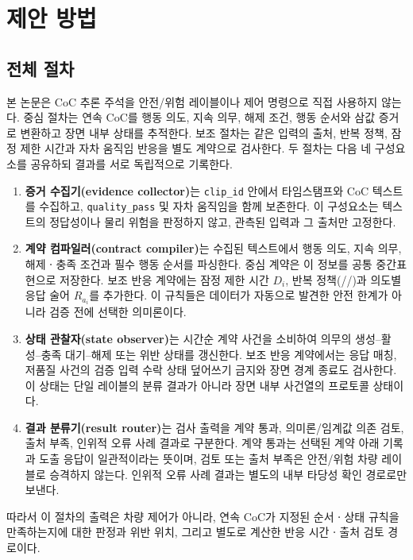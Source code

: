 \section{제안 방법}
\label{sec:method}

\subsection{전체 절차}
본 논문은 CoC 추론 주석을 안전/위험 레이블이나 제어 명령으로 직접 사용하지 않는다. 중심 절차는 연속 CoC를 행동 의도, 지속 의무, 해제 조건, 행동 순서와 삼값 증거로 변환하고 장면 내부 상태를 추적한다. 보조 절차는 같은 입력의 출처, 반복 정책, 잠정 제한 시간과 자차 움직임 반응을 별도 계약으로 검사한다. 두 절차는 다음 네 구성요소를 공유하되 결과를 서로 독립적으로 기록한다.

\begin{enumerate}
\item \textbf{증거 수집기(evidence collector)}는 \texttt{clip\_id} 안에서 타임스탬프와 CoC 텍스트를 수집하고, \texttt{quality\_pass} 및 자차 움직임을 함께 보존한다. 이 구성요소는 텍스트의 정답성이나 물리 위험을 판정하지 않고, 관측된 입력과 그 출처만 고정한다.
\item \textbf{계약 컴파일러(contract compiler)}는 수집된 텍스트에서 행동 의도, 지속 의무, 해제ㆍ충족 조건과 필수 행동 순서를 파싱한다. 중심 계약은 이 정보를 공통 중간표현으로 저장한다. 보조 반응 계약에는 잠정 제한 시간 $D_i$, 반복 정책(\preserve/\reset/\dedup)과 의도별 응답 술어 $R_{a_i}$를 추가한다. 이 규칙들은 데이터가 자동으로 발견한 안전 한계가 아니라 검증 전에 선택한 의미론이다.
\item \textbf{상태 관찰자(state observer)}는 시간순 계약 사건을 소비하여 의무의 생성--활성--충족 대기--해제 또는 위반 상태를 갱신한다. 보조 반응 계약에서는 응답 매칭, 저품질 사건의 검증 입력 수락 상태 덮어쓰기 금지와 장면 경계 종료도 검사한다. 이 상태는 단일 레이블의 분류 결과가 아니라 장면 내부 사건열의 프로토콜 상태이다.
\item \textbf{결과 분류기(result router)}는 검사 출력을 계약 통과, 의미론/임계값 의존 검토, 출처 부족, 인위적 오류 사례 결과로 구분한다. 계약 통과는 선택된 계약 아래 기록과 도출 응답이 일관적이라는 뜻이며, 검토 또는 출처 부족은 안전/위험 차량 레이블로 승격하지 않는다. 인위적 오류 사례 결과는 별도의 내부 타당성 확인 경로로만 보낸다.
\end{enumerate}

따라서 이 절차의 출력은 차량 제어가 아니라, 연속 CoC가 지정된 순서ㆍ상태 규칙을 만족하는지에 대한 판정과 위반 위치, 그리고 별도로 계산한 반응 시간ㆍ출처 검토 경로이다.

